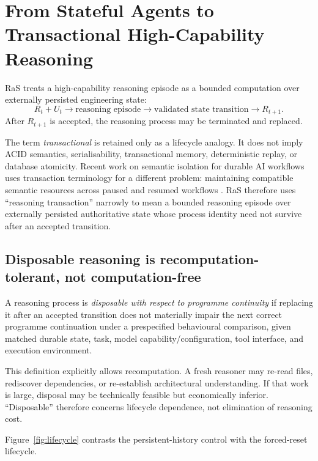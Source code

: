 \section{From Stateful Agents to Transactional High-Capability Reasoning}
\label{sec:transactional}

RaS treats a high-capability reasoning episode as a bounded computation over externally persisted engineering state:
\begin{equation}
R_t + U_t
\rightarrow
\text{reasoning episode}
\rightarrow
\text{validated state transition}
\rightarrow
R_{t+1}.
\end{equation}
After $R_{t+1}$ is accepted, the reasoning process may be terminated and replaced.

The term \emph{transactional} is retained only as a lifecycle analogy. It does not imply ACID semantics, serialisability, transactional memory, deterministic replay, or database atomicity. Recent work on semantic isolation for durable AI workflows uses transaction terminology for a different problem: maintaining compatible semantic resources across paused and resumed workflows \citep{mozafari2026semantic}. RaS therefore uses “reasoning transaction” narrowly to mean a bounded reasoning episode over externally persisted authoritative state whose process identity need not survive after an accepted transition.

\subsection{Disposable reasoning is recomputation-tolerant, not computation-free}

A reasoning process is \emph{disposable with respect to programme continuity} if replacing it after an accepted transition does not materially impair the next correct programme continuation under a prespecified behavioural comparison, given matched durable state, task, model capability/configuration, tool interface, and execution environment.

This definition explicitly allows recomputation. A fresh reasoner may re-read files, rediscover dependencies, or re-establish architectural understanding. If that work is large, disposal may be technically feasible but economically inferior. “Disposable” therefore concerns lifecycle dependence, not elimination of reasoning cost.

Figure~\ref{fig:lifecycle} contrasts the persistent-history control with the forced-reset lifecycle.

